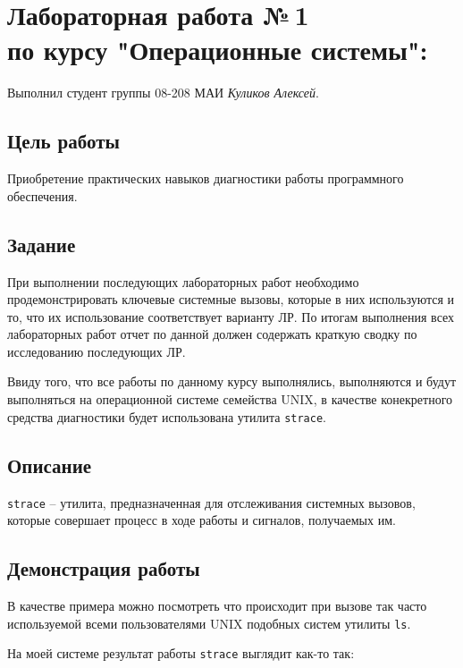 \documentclass[12pt]{article}
\begin{document}
\section*{Лабораторная работа №\,1 \\ по курсу "Операционные системы": }

Выполнил студент группы 08-208 МАИ \textit{Куликов Алексей}.

\subsection*{Цель работы}
Приобретение практических навыков диагностики работы программного обеспечения.
 
\subsection*{Задание}
При выполнении последующих лабораторных работ необходимо продемонстрировать ключевые системные вызовы, которые в них используются и то, что их использование соответствует варианту ЛР. 
По итогам выполнения всех лабораторных работ отчет по данной должен содержать краткую сводку по исследованию последующих ЛР.

Ввиду того, что все работы по данному курсу выполнялись, выполняются и будут выполняться на операционной системе семейства UNIX, в качестве конекретного средства диагностики будет использована утилита \verb|strace|.

\subsection*{Описание}

\verb|strace| -- утилита, предназначенная для отслеживания системных вызовов, которые совершает процесс в ходе работы и сигналов, получаемых им. 

\subsection*{Демонстрация работы}
В качестве примера можно посмотреть что происходит при вызове так часто используемой всеми пользователями UNIX подобных систем утилиты \verb|ls|.

На моей системе результат работы \verb|strace| выглядит как-то так:
\end{document}
